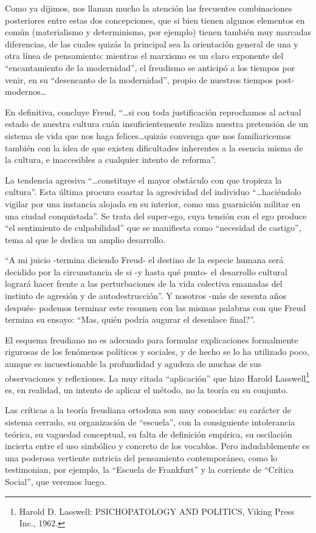 \documentclass[
]{book}
\begin{document}
Como ya dijimos, nos llaman mucho la atención las frecuentes combinaciones posteriores entre estas dos concepciones, que si bien tienen algunos elementos en común (materialismo y determinismo, por ejemplo) tienen también muy marcadas diferencias, de las cuales quizás la principal sea la orientación general de una y otra línea de pensamiento: mientras el marxismo es un claro exponente del ``encantamiento de la modernidad'', el freudismo se anticipó a los tiempos por venir, en su ``desencanto de la modernidad'', propio de nuestros tiempos post-modernos\ldots{}

En definitiva, concluye Freud, ``\ldots si con toda justificación reprochamos al actual estado de nuestra cultura cuán insuficientemente realiza nuestra pretensión de un sistema de vida que nos haga felices\ldots quizás convenga que nos familiaricemos también con la idea de que existen dificultades inherentes a la esencia misma de la cultura, e inaccesibles a cualquier intento de reforma''.

La tendencia agresiva ``\ldots constituye el mayor obstáculo con que tropieza la cultura''. Esta última procura coartar la agresividad del individuo ``\ldots haciéndolo vigilar por una instancia alojada en su interior, como una guarnición militar en una ciudad conquistada''. Se trata del super-ego, cuya tensión con el ego produce ``el sentimiento de culpabilidad'' que se manifiesta como ``necesidad de castigo'', tema al que le dedica un amplio desarrollo.

``A mi juicio -termina diciendo Freud- el destino de la especie humana será decidido por la circunstancia de si -y hasta qué punto- el desarrollo cultural logrará hacer frente a las perturbaciones de la vida colectiva emanadas del instinto de agresión y de autodestrucción''. Y nosotros -más de sesenta años después- podemos terminar este resumen con las mismas palabras con que Freud termina su ensayo: ``Mas, quién podría augurar el desenlace final?''.

El esquema freudiano no es adecuado para formular explicaciones formalmente rigurosas de los fenómenos políticos y sociales, y de hecho se lo ha utilizado poco, aunque es incuestionable la profundidad y agudeza de muchas de sus observaciones y reflexiones. La muy citada ``aplicación'' que hizo Harold Lasswell\footnote{Harold D. Lasswell: PSICHOPATOLOGY AND POLITICS, Viking Press Inc., 1962.} es, en realidad, un intento de aplicar el método, no la teoría en su conjunto.

Las críticas a la teoría freudiana ortodoxa son muy conocidas: su carácter de sistema cerrado, su organización de ``escuela'', con la consiguiente intolerancia teórica, su vaguedad conceptual, su falta de definición empírica, su oscilación incierta entre el uso simbólico y concreto de los vocablos. Pero indudablemente es una poderosa vertiente nutricia del pensamiento contemporáneo, como lo testimonian, por ejemplo, la ``Escuela de Frankfurt'' y la corriente de ``Crítica Social'', que veremos luego.
\end{document}
